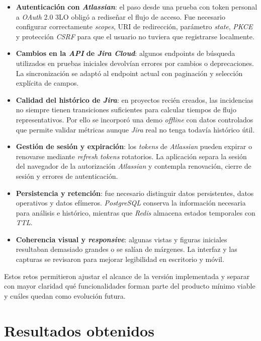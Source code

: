 \begin{itemize}
    \item \textbf{Autenticación con \textit{Atlassian}}: el paso desde una prueba con token personal a \textit{OAuth} 2.0 3LO obligó a rediseñar el flujo de acceso. Fue necesario configurar correctamente \textit{scopes}, URI de redirección, parámetro \textit{state}, \textit{PKCE} y protección \textit{CSRF} para que el usuario no tuviera que registrarse localmente.
    \item \textbf{Cambios en la \textit{API} de \textit{Jira Cloud}}: algunos endpoints de búsqueda utilizados en pruebas iniciales devolvían errores por cambios o deprecaciones. La sincronización se adaptó al endpoint actual con paginación y selección explícita de campos.
    \item \textbf{Calidad del histórico de \textit{Jira}}: en proyectos recién creados, las incidencias no siempre tienen transiciones suficientes para calcular tiempos de flujo representativos. Por ello se incorporó una demo \textit{offline} con datos controlados que permite validar métricas aunque \textit{Jira} real no tenga todavía histórico útil.
    \item \textbf{Gestión de sesión y expiración}: los \textit{tokens} de \textit{Atlassian} pueden expirar o renovarse mediante \textit{refresh tokens} rotatorios. La aplicación separa la sesión del navegador de la autorización \textit{Atlassian} y contempla renovación, cierre de sesión y errores de autenticación.
    \item \textbf{Persistencia y retención}: fue necesario distinguir datos persistentes, datos operativos y datos efímeros. \textit{PostgreSQL} conserva la información necesaria para análisis e histórico, mientras que \textit{Redis} almacena estados temporales con \textit{TTL}.
    \item \textbf{Coherencia visual y \textit{responsive}}: algunas vistas y figuras iniciales resultaban demasiado grandes o se salían de márgenes. La interfaz y las capturas se revisaron para mejorar legibilidad en escritorio y móvil.
\end{itemize}

Estos retos permitieron ajustar el alcance de la versión implementada y separar con mayor claridad qué funcionalidades forman parte del producto mínimo viable y cuáles quedan como evolución futura.


\section{Resultados obtenidos}

